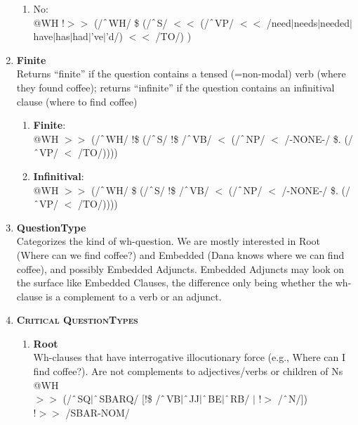 \begin{enumerate}
\begin{enumerate}
            \item No: \\
            @WH !$>\!\!>$ (/$\string^$WH/ \$ (/$\string^$S/ $<\!\!<$ (/$\string^$VP/ $<\!\!<$ /need$|$needs$|$needed$|$have$|$has$|$had$|$'ve$|$'d/) $<\!\!<$ /TO/) )

        \end{enumerate}
    \item \textbf{Finite}\\
    Returns ``finite'' if the question contains a tensed (=non-modal) verb (\textsf{where they found coffee}); returns ``infinite'' if the question contains an infinitival clause (\textsf{where to find coffee})
        \begin{enumerate}
            \item \textbf{Finite}: \\
            @WH $>\!\!>$ (/$\string^$WH/ !\$ (/$\string^$S/ !\$ /$\string^$VB/ $<$ (/$\string^$NP/ $<$ /-NONE-/ \$. (/$\string^$VP/ $<$ /TO/))))
            \item \textbf{Infinitival}: \\
            @WH $>\!\!>$ (/$\string^$WH/ \$ (/$\string^$S/ !\$ /$\string^$VB/ $<$ (/$\string^$NP/ $<$ /-NONE-/ \$. (/$\string^$VP/ $<$ /TO/))))
        \end{enumerate}
    
    \item \textbf{QuestionType}\\
    Categorizes the kind of wh-question. We are mostly interested in Root (\textsf{Where can we find coffee?}) and Embedded (Dana knows where we can find coffee), and possibly Embedded Adjuncts. Embedded Adjuncts may look on the surface like Embedded Clauses, the difference only being whether the wh-clause is a complement to a verb or an adjunct. 

    \item[] \textbf{\textsc{Critical QuestionTypes}}
        \begin{enumerate}
            \item \textbf{Root}\\
            Wh-clauses that have interrogative illocutionary force (e.g., \textsf{Where can I find coffee?}). Are not complements to adjectives/verbs or children of Ns\\
            @WH \\
            $>\!\!>$ (/$\string^$SQ$|\string^$SBARQ/ [!\$ /$\string^$VB$|\string^$JJ$|\string^$BE$|\string^$RB/ $|$ !$>$ /$\string^$N/]) \\
            !$>\!\!>$ /SBAR-NOM/


\end{enumerate}
\end{enumerate}

